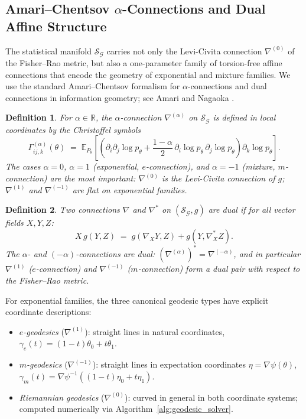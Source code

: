 \documentclass[a4paper,fleqn]{cas-dc}
\newtheorem{definition}{Definition}
\newcommand{\R}{\mathbb{R}}
\newcommand{\E}{\mathbb{E}}
\newcommand{\calS}{\mathcal{S}}
\newcommand{\calG}{\mathcal{G}}
\begin{document}
\subsection{Amari--Chentsov \texorpdfstring{$\alpha$}{alpha}-Connections and Dual Affine Structure}
\label{subsec:alpha_connections}

The statistical manifold $\calS_{\calG}$ carries not only the Levi-Civita
connection $\nabla^{(0)}$ of the Fisher--Rao metric, but also a one-parameter
family of torsion-free affine connections that encode the geometry of
exponential and mixture families.
We use the standard Amari--Chentsov formalism for $\alpha$-connections and
dual connections in information geometry; see Amari and Nagaoka
\cite{amari2000methods}.

\begin{definition}%
  \label{def:alpha_connection}
  For $\alpha\in\R$, the \emph{$\alpha$-connection} $\nabla^{(\alpha)}$ on
  $\calS_{\calG}$ is defined in local coordinates by the Christoffel symbols
  \begin{equation}
    \Gamma^{(\alpha)}_{ij,k}(\theta)
    \;=\; \E_{P_\theta}\!\left[
      \left(\partial_i\partial_j\log p_\theta
        + \frac{1-\alpha}{2}\,\partial_i\log p_\theta\,\partial_j\log p_\theta
      \right)\partial_k\log p_\theta
    \right].
    \label{eq:alpha_christoffel}
  \end{equation}
  The cases $\alpha=0$, $\alpha=1$ (exponential, $e$-connection), and
  $\alpha=-1$ (mixture, $m$-connection) are the most important:
  $\nabla^{(0)}$ is the Levi-Civita connection of $g$; $\nabla^{(1)}$
  and $\nabla^{(-1)}$ are flat on exponential families.
\end{definition}

\begin{definition}%
  \label{def:dual_connections}
  Two connections $\nabla$ and $\nabla^*$ on $(\calS_{\calG},g)$ are
  \emph{dual} if for all vector fields $X,Y,Z$:
  \[
    X\,g(Y,Z) \;=\; g(\nabla_X Y, Z) + g(Y, \nabla^*_X Z).
  \]
  The $\alpha$- and $(-\alpha)$-connections are dual:
  $(\nabla^{(\alpha)})^* = \nabla^{(-\alpha)}$, and in particular
  $\nabla^{(1)}$ ($e$-connection) and $\nabla^{(-1)}$ ($m$-connection)
  form a dual pair with respect to the Fisher--Rao metric.
\end{definition}

For exponential families, the three canonical geodesic types have explicit
coordinate descriptions:
\begin{itemize}
  \item \emph{$e$-geodesics} ($\nabla^{(1)}$): straight lines in natural
        coordinates, $\gamma_e(t) = (1-t)\theta_0 + t\theta_1$.
  \item \emph{$m$-geodesics} ($\nabla^{(-1)}$): straight lines in expectation
        coordinates $\eta = \nabla\psi(\theta)$,
        $\gamma_m(t) = \nabla\psi^{-1}((1-t)\eta_0 + t\eta_1)$.
  \item \emph{Riemannian geodesics} ($\nabla^{(0)}$): curved in general in
        both coordinate systems; computed numerically via
        Algorithm~\ref{alg:geodesic_solver}.
\end{itemize}
\end{document}
